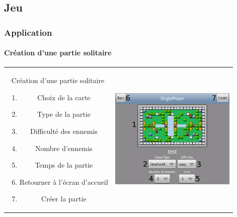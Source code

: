 \subsection{Jeu}
	
	\begin{frame}
	\frametitle{Application}
	\framesubtitle{Création d'une partie solitaire}
	
		\begin{tabular}{cc}
			\begin{minipage}{5cm}
				Création d'une partie solitaire
				\begin{enumerate}
					\item Choix de la carte
					\item Type de la partie
					\item Difficulté des ennemis
					\item Nombre d'ennemis
					\item Temps de la partie
					\item Retourner à l'écran d'accueil
					\item Créer la partie
				\end{enumerate}
			\end{minipage} &
			\begin{minipage}{7cm}
				\includegraphics[width=6cm]{img/singleplayerbis.png} 
			\end{minipage}\\
		\end{tabular}
	
	\end{frame}
	

